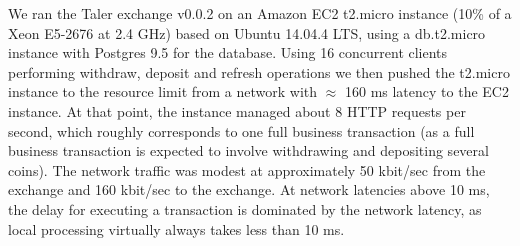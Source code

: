 \documentclass{llncs}
\begin{document}

We ran the Taler exchange v0.0.2 on an Amazon EC2 t2.micro instance
(10\% of a Xeon E5-2676 at 2.4 GHz) based on Ubuntu 14.04.4 LTS, using
a db.t2.micro instance with Postgres 9.5 for the database.  Using 16
concurrent clients performing withdraw, deposit and refresh operations
we then pushed the t2.micro instance to the resource limit
from a network with $\approx$ 160 ms latency to
the EC2 instance.  At that point, the instance managed about 8 HTTP
requests per second, which roughly corresponds to one full business
transaction (as a full business transaction is expected to involve
withdrawing and depositing several coins).  The network traffic was
modest at approximately 50 kbit/sec from the exchange
and 160 kbit/sec to the exchange.
At network latencies above 10 ms, the delay
for executing a transaction is dominated by the network latency, as
local processing virtually always takes less than 10 ms.
\end{document}
